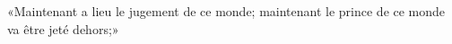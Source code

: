 \encetemps \jesusfoulejuifs
	«Maintenant a lieu le jugement de ce monde;
	maintenant le prince de ce monde va être jeté dehors;»
